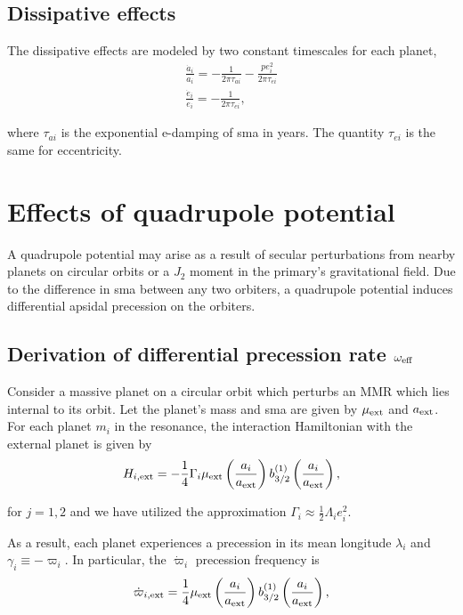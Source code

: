 \documentclass[11pt]{article}
\begin{document}
\subsection{Dissipative effects}
\label{sec:orga4e5e92}
The dissipative effects are modeled
by two constant timescales for each planet, 
\begin{align}
  \frac{\dot a_i}{a_i} = -\frac{1}{2\pi\tau_{ai}} - \frac{pe_i^2}{2\pi\tau_{ei}} \\
  \frac{\dot e_i}{e_i} = -\frac{1}{2\pi\tau_{ei}} ,
\end{align}

where \(\tau_{ai}\) is the exponential e-damping of sma in years.  The
quantity \(\tau_{ei}\) is the same for eccentricity.

\section{Effects of quadrupole potential}
\label{sec:org31db6c5}
A quadrupole potential may arise as a result of secular perturbations
from nearby planets on circular orbits or a \(J_2\) moment in the
primary's gravitational field. Due to the difference in sma
between any two orbiters, a quadrupole potential induces
differential apsidal precession on the orbiters.

\subsection{Derivation of differential precession rate \(\omega_{\rm eff}\)}
\label{sec:org104761f}
Consider a massive planet on a circular orbit which perturbs an MMR
which lies internal to its orbit.  Let the planet's mass and sma are
given by \(\mu_{\rm ext}\) and \(a_{\rm ext}\).  For each planet \(m_i\) in
the resonance, the interaction Hamiltonian with the external
planet is given by
\begin{equation}
  H_{i,\rm ext} = -\frac14 \Gamma_i \mu_{\rm ext}
  \left(\frac{a_i}{a_{\rm ext}}\right) b_{3/2}^{(1)}\left(\frac{a_i}{a_{\rm ext}}\right),
\end{equation}

\noindent
for \(j=1,2\) and we have utilized the approximation \(\Gamma_i \approx \frac12 \Lambda_i e_i^2\).

As a result, each planet experiences a precession in its mean longitude \(\lambda_i\) and
\(\gamma_i\equiv -\varpi_i\). In particular, the \(\dot\varpi_i\) precession frequency
is
\begin{equation}
\dot\varpi_{i, \rm ext} = \frac14 \mu_{\rm ext} 
    \left(\frac{a_i}{a_{\rm ext}}\right) b_{3/2}^{(1)}\left(\frac{a_i}{a_{\rm ext}}\right),
\end{equation}
\end{document}
